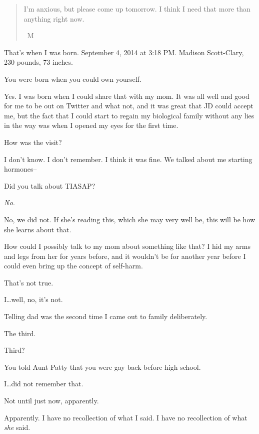 \begin{paracol}{2}
\begin{leftcolumn}
\begin{quotation}
I'm anxious, but please come up tomorrow. I think I need that more than anything right now.

~M
\end{quotation}

That's when I was born. September 4, 2014 at 3:18 PM. Madison Scott-Clary, 230 pounds, 73 inches.

\begin{ally}
You were born when you could own yourself.
\end{ally}
Yes. I was born when I could share that with my mom. It was all well and good for me to be out on Twitter and what not, and it was great that JD could accept me, but the fact that I could start to regain my biological family without any lies in the way was when I opened my eyes for the first time.

\begin{ally}
How was the visit?
\end{ally}
I don't know. I don't remember. I think it was fine. We talked about me starting hormones--

\begin{ally}
Did you talk about TIASAP?
\end{ally}
\emph{No.}

No, we did not. If she's reading this, which she may very well be, this will be how she learns about that.

How could I possibly talk to my mom about something like that? I hid my arms and legs from her for years before, and it wouldn't be for another year before I could even bring up the concept of self-harm.

\begin{ally}
That's not true.
\end{ally}
I\ldots{}well, no, it's not.
\newpage

\noindent Telling dad was the second time I came out to family deliberately.

\begin{ally}
The third.
\end{ally}
Third?

\begin{ally}
You told Aunt Patty that you were gay back before high school.
\end{ally}
I\ldots{}did not remember that.

\begin{ally}
Not until just now, apparently.
\end{ally}
Apparently. I have no recollection of what I said. I have no recollection of what \emph{she} said.


\end{leftcolumn}
\end{paracol}
